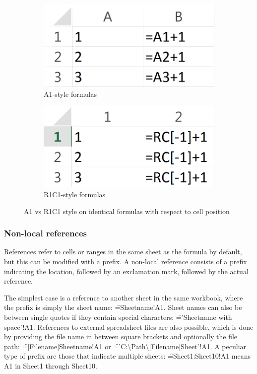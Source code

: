 \begin{figure}
\centerfloat
\begin{subfigure}[t]{0.35\textwidth}
\includegraphics[width=1\textwidth]{anatomy/r1c1comp-a1}
\caption{A1-style formulas}
\end{subfigure}
\hspace{0.1\textwidth}
\begin{subfigure}[t]{0.35\textwidth}
\includegraphics[width=1\textwidth]{anatomy/r1c1comp-r1c1}
\caption{R1C1-style formulas}
\end{subfigure}
\caption{A1 vs R1C1 style on identical formulas with respect to cell position}
\label{fig:r1c1comp}
\end{figure}

\subsubsection{Non-local references}
\label{subsection:ExternalRefsDDE}

References refer to cells or ranges in the same sheet as the formula by default, but this can be modified with a prefix. A non-local reference consists of a prefix indicating the location, followed by an exclamation mark, followed by the actual reference.

The simplest case is a reference to another sheet in the same workbook, where the prefix is simply the sheet name: \f{=Sheetname!A1}.
Sheet names can also be between single quotes if they contain special characters: \f{='Sheetname with space'!A1}. 
References to external spreadsheet files are also possible, which is done by providing the file name in between square brackets and optionally the file path: \f{=[Filename]Sheetname!A1} or \f{='C:{\textbackslash}Path{\textbackslash}[Filename]Sheet'!A1}.
A peculiar type of prefix are those that indicate multiple sheets: \f{=Sheet1:Sheet10!A1} means A1 in Sheet1 through Sheet10.

